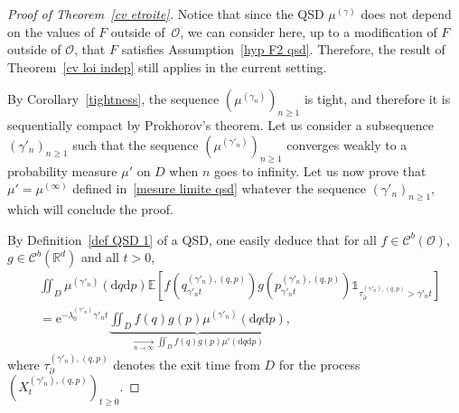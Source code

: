\documentclass[preprint,EJP]{ejpecp}
\begin{document}
\begin{proof}[Proof of Theorem~\ref{cv etroite}]

Notice that since the QSD $\mu^{(\gamma)}$ does not depend on the values of $F$ outside of~$\mathcal{O}$, we can consider here, up to a modification of $F$ outside of $\mathcal{O}$, that $F$ satisfies Assumption~\ref{hyp F2 qsd}. Therefore, the result of Theorem~\ref{cv loi indep} still applies in the current setting.  

By Corollary~\ref{tightness}, the sequence $(\mu^{(\gamma_n)})_{n\geq1}$ is tight, and therefore it is sequentially compact by Prokhorov's theorem. Let us consider a subsequence $(\gamma'_n)_{n\geq1}$ such that the sequence $(\mu^{(\gamma'_n)})_{n\geq1}$ converges weakly to a probability measure $\mu'$ on $D$ when $n$ goes to infinity. Let us now prove that $\mu'=\mu^{(\infty)}$ defined in~\eqref{mesure limite qsd} whatever the sequence $(\gamma'_n)_{n\geq1}$, which will conclude the proof. 

By Definition~\ref{def QSD 1} of a QSD, one easily deduce that for all $f\in\mathcal{C}^b(\mathcal{O})$, $g\in\mathcal{C}^b(\mathbb{R}^d)$ and all $t>0$,
\begin{align} 
&\iint_{D}\mu^{(\gamma'_n)}(\mathrm{d}q\mathrm{d}p) \mathbb{E}\left[f(q^{(\gamma'_n),(q,p)}_{\gamma'_n t}) g(p^{(\gamma'_n),(q,p)}_{\gamma'_n t}) \mathbb{1}_{\tau^{(\gamma'_n),(q,p)}_\partial>\gamma'_n t}\right]\nonumber\\
&=\mathrm{e}^{-\lambda_0^{(\gamma'_n)}\gamma'_n  t} \underbrace{\iint_D f(q) g(p) \mu^{(\gamma'_n)}(\mathrm{d}q\mathrm{d}p) }_{\underset{n\rightarrow \infty}{{\longrightarrow}}\iint_D f(q) g(p) \mu'(\mathrm{d}q\mathrm{d}p)},\label{ecriture qsd} 
\end{align}
where $\tau^{(\gamma'_n),(q,p)}_\partial$ denotes the exit time from $D$ for the process $(X^{(\gamma'_n),(q,p)}_t)_{t \geq 0}$.


\end{proof}
\end{document}
